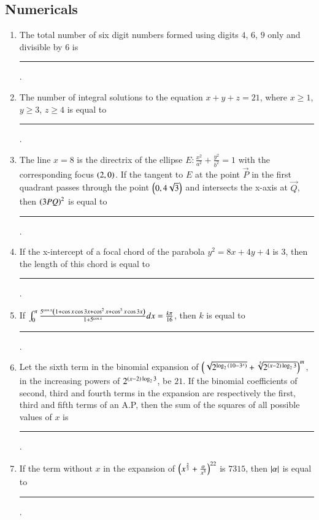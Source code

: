 \documentclass[journal,12pt,onecolumn]{IEEEtran}
\theoremstyle{remark}
\begin{document}
\subsection{Numericals}
\begin{enumerate}

\item The total number of six digit numbers formed using digits $4$, $6$, $9$ only and divisible by $6$ is \rule{1cm}{0.15mm}.

\hfill{}

\item The number of integral solutions to the equation $x+y+z=21$, where $x\geq 1$, $y\geq 3$, $z\geq 4$ is equal to \rule{1cm}{0.15mm}.

\hfill{}

\item The line $x=8$ is the directrix of the ellipse $E:\frac{x^2}{a^2}+\frac{y^2}{b^2}=1$ with the corresponding focus $\left(2,0\right)$. If the tangent to $E$ at the point $\vec{P}$ in the first quadrant passes through the point $\left(0,4\sqrt{3}\right)$ and intersects the x-axis at $\vec{Q}$, then $\left(3PQ\right)^2$ is equal to \rule{1cm}{0.15mm}.

\hfill{}

\item If the x-intercept of a focal chord of the parabola $y^2=8x+4y+4$ is 3, then the length of this chord is equal to \rule{1cm}{0.15mm}.

\hfill{}

\item If $\int_{0}^{\pi}\frac{5^{\cos x}\left(1+\cos x\cos 3x+\cos^{2}x+\cos^{3}x\cos 3x\right)}{1+5^{\cos x}}dx=\frac{k\pi}{16}$, then $k$ is equal to \rule{1cm}{0.15mm}.

\hfill{}

\item Let the sixth term in the binomial expansion of $\left(\sqrt{2^{\log_2{\left(10-3^x\right)}}}+\sqrt[5]{2^{\left(x-2\right)\log_2{3}}}\right)^m$, in the increasing powers of $2^{\left(x-2\right)\log_2{3}}$, be $21$. If the binomial coefficients of second, third and fourth terms in the expansion are respectively the first, third and fifth terms of an A.P, then the sum of the squares of all possible values of $x$ is \rule{1cm}{0.15mm}.

\hfill{}

\item If the term without $x$ in the expansion of $\left(x^{\frac{2}{3}}+\frac{\alpha}{x^3}\right)^{22}$ is $7315$, then $\left\vert\alpha\right\vert$ is equal to \rule{1cm}{0.15mm}.


\end{enumerate}
\end{document}
